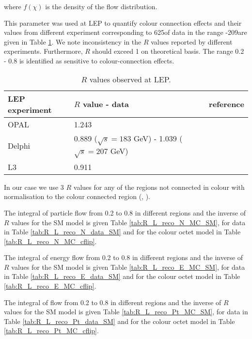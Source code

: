 where $f(\chi)$ is the density of the flow distribution.

This parameter was used at LEP to quantify colour connection effects and their values from different experiment corresponding to 625\pbinv of data in the range -209\GeV are given in Table \ref{tab:LEP_R}. We note inconsistency in the $R$ values reported by different experiments. Furthermore, $R$ should exceed 1 on theoretical basis. The range 0.2 - 0.8 is identified as sensitive to colour-connection effects. 
\begin{table}
\centering
\caption{$R$ values observed at LEP.}
\label{tab:LEP_R}
\begin{tabular}{lll}
LEP experiment & $R$ value - data                                        & reference\\
\hline
    OPAL       & 1.243                                                   & \cite{Abbiendi:2005es}\\
    Delphi     & 0.889 ($\sqrt{s}=183$ GeV) - 1.039 ($\sqrt{s}=207$ GeV) & \cite{Abdallah:2006uq}\\
    L3         & 0.911                                                   & \cite{Achard:2003pe}\\
  \end{tabular}
\end{table} 

In our case we use 3 $R$ values for any of the regions not connected in colour with normalisation to the colour connected region (\leadingjet, \scndleadingjet).

The integral of particle flow from 0.2 to 0.8 in different regions and the inverse of $R$ values for the SM model is given Table \ref{tab:R_L_reco_N_MC_SM}, for data in Table \ref{tab:R_L_reco_N_data_SM} and for the \PW colour octet model in Table \ref{tab:R_L_reco_N_MC_cflip}.

The integral of energy flow from 0.2 to 0.8 in different regions and the inverse of $R$ values for the SM model is given Table \ref{tab:R_L_reco_E_MC_SM}, for data in Table \ref{tab:R_L_reco_E_data_SM} and for the \PW colour octet model in Table \ref{tab:R_L_reco_E_MC_cflip}.

The integral of \pt flow from 0.2 to 0.8 in different regions and the inverse of $R$ values for the SM model is given Table \ref{tab:R_L_reco_Pt_MC_SM}, for data in Table \ref{tab:R_L_reco_Pt_data_SM} and for the \PW colour octet model in Table \ref{tab:R_L_reco_Pt_MC_cflip}.



